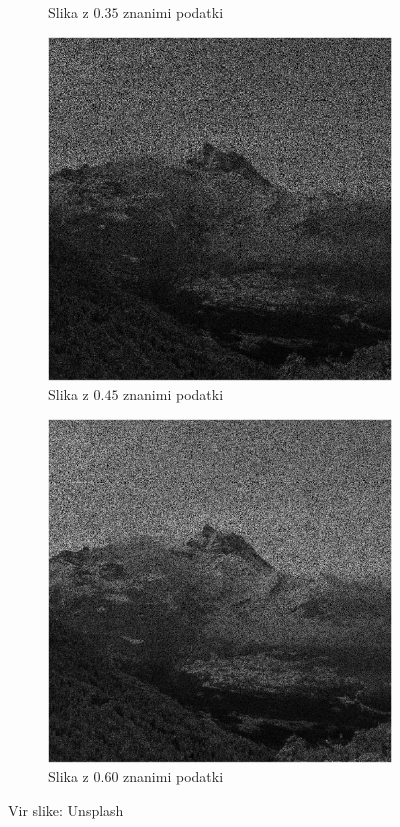 \begin{figure}[!ht]
\begin{subfigure}{0.49\linewidth}
        \caption{Slika z $0.35$ znanimi podatki}
    \end{subfigure}
    \begin{subfigure}{0.49\linewidth}
        \includegraphics[width=\linewidth]{Poglavja/Slike/grayscale1000/slikaInput45.png}
        \caption{Slika z $0.45$ znanimi podatki}
    \end{subfigure}
    \hfill
    \begin{subfigure}{0.49\linewidth}
        \includegraphics[width=\linewidth]{Poglavja/Slike/grayscale1000/slikaInput60.png}
        \caption{Slika z $0.60$ znanimi podatki}
    \end{subfigure}
    \caption{Vir slike: Unsplash}
\end{figure}

